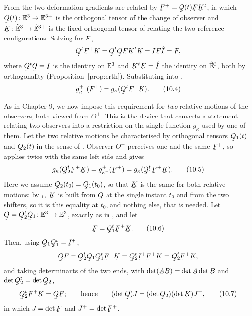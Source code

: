 From  the two deformation gradients are related by
$\bF^{+}=\bQ(t)\bF\bK^{t}$, in which
$\bQ(t)\colon\Vt\to\mathbb{E}^{3+}$ is the orthogonal tensor of the
change of observer and $\bK\colon\hVt\to\hat{\mathbb{E}}^{3+}$ is the
fixed orthogonal tensor of  relating the two reference
configurations. Solving for $\bF$,
\[
   \bQ^{t}\bF^{+}\bK=\bQ^{t}\bQ\bF\bK^{t}\bK=\I\bF\hI=\bF ,
\]
where $\bQ^{t}\bQ=\I$ is the identity on $\mathbb{E}^{3}$ and $\bK^{t}\bK=\hI$ the
identity on $\hat{\mathbb{E}}^{3}$, both by orthogonality (Proposition~\ref{prop:orth}).
Substituting into ,
\begin{equation}
   g^{+}_{\kappa^{+}}(\bF^{+})=g_{\kappa}(\bQ^{t}\bF^{+}\bK).
   \tag{10.4}\label{eq:10.4}
\end{equation}

As in Chapter 9, we now impose this requirement for \emph{two} relative
motions of the observers, both viewed from $O^{+}$. This is the device
that converts a statement relating two observers into a restriction on
the single function $g_{\kappa}$ used by one of them. Let the two
relative motions be characterised by orthogonal tensors $\bQ_{1}(t)$ and
$\bQ_{2}(t)$ in the sense of . Observer $O^{+}$ perceives one
and the same $\bF^{+}$, so  applies twice with the same left
side and gives
\begin{equation}
   g_{\kappa}(\bQ_{2}^{t}\bF^{+}\bK)=g^{+}_{\kappa^{+}}(\bF^{+})
   =g_{\kappa}(\bQ_{1}^{t}\bF^{+}\bK).
   \tag{10.5}\label{eq:10.5}
\end{equation}
Here we assume $\bQ_{2}(t_{0})=\bQ_{1}(t_{0})$, so that $\bK$ is the same
for both relative motions; by $_{1}$, $\bK$ is built from
$\bQ$ at the single instant $t_{0}$ and from the two shifters, so it is
this equality at $t_{0}$, and nothing else, that is needed. Let
$\bQ=\bQ_{2}^{t}\bQ_{1}\colon\Vt\to\Vt$, exactly as in , and
let
\begin{equation}
   \bF=\bQ_{1}^{t}\bF^{+}\bK .
   \tag{10.6}\label{eq:10.6}
\end{equation}
Then, using $\bQ_{1}\bQ_{1}^{t}=\I^{+}$,
\[
   \bQ\bF=\bQ_{2}^{t}\bQ_{1}\bQ_{1}^{t}\bF^{+}\bK
        =\bQ_{2}^{t}\I^{+}\bF^{+}\bK=\bQ_{2}^{t}\bF^{+}\bK ,
\]
and taking determinants of the two ends, with
$\det(\bA\bB)=\det\bA\det\bB$ and $\det\bQ_{2}^{t}=\det\bQ_{2}$,
\begin{equation}
   \bQ_{2}^{t}\bF^{+}\bK=\bQ\bF;\qquad\text{hence}\qquad
   (\det\bQ)J=(\det\bQ_{2})(\det\bK)J^{+} ,
   \tag{10.7}\label{eq:10.7}
\end{equation}
in which $J=\det\bF$ and $J^{+}=\det\bF^{+}$.

